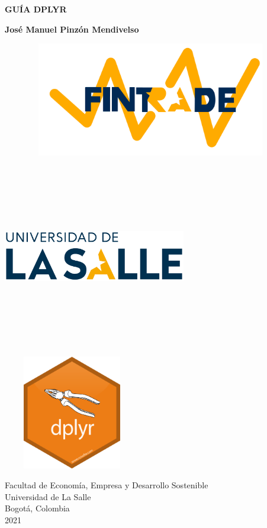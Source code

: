 \begin{titlepage}
    \begin{center}
        \vspace*{1cm}
            
        \Huge
        \textbf{GUÍA DPLYR}
            
        \vspace{0.5cm}
        \LARGE
        \textbf{José Manuel Pinzón Mendivelso}
				
				\includegraphics[width=13cm,height=5cm]{Fintrade}    
            
            
        \vspace{0.5cm}
										
        \includegraphics[width=8cm,height=8cm]{LOGO}    

        \vspace{1.5cm}

        \includegraphics[width=6cm,height=5cm]{Logo_dplyr}
				
				\vfill
						
        \Large
        Facultad de Economía, Empresa y Desarrollo Sostenible\\
        Universidad de La Salle\\
        Bogotá, Colombia\\
        2021
            
    \end{center}
\end{titlepage}
